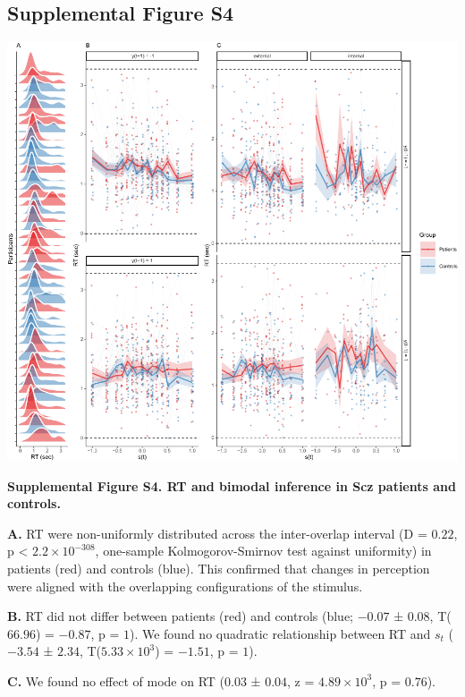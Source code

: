 \documentclass[
]{article}
\begin{document}
\newpage

\hypertarget{supplemental-figure-s4}{%
\subsection{Supplemental Figure S4}\label{supplemental-figure-s4}}

\includegraphics{modes_ketamine_scz_files/figure-latex/rev_Supplemental_Figure_S4-1.pdf}

\textbf{Supplemental Figure S4. RT and bimodal inference in Scz patients
and controls.}

\textbf{A.} RT were non-uniformly distributed across the inter-overlap
interval (D = \(0.22\), p < \(\ensuremath{2.2\times 10^{-308}}\), one-sample Kolmogorov-Smirnov test
against uniformity) in patients (red) and controls (blue). This
confirmed that changes in perception were aligned with the overlapping
configurations of the stimulus.

\textbf{B.} RT did not differ between patients (red) and controls (blue;
\(-0.07\) ± \(0.08\), T(\(66.96\)) = \(-0.87\), p = \(1\)). We found no
quadratic relationship between RT and \(s_t\) (\(-3.54\) ± \(2.34\),
T(\(\ensuremath{5.33\times 10^{3}}\)) = \(-1.51\), p = \(1\)).

\textbf{C.} We found no effect of mode on RT (\(0.03\) ± \(0.04\), z =
\(\ensuremath{4.89\times 10^{3}}\), p = \(0.76\)).
\end{document}
